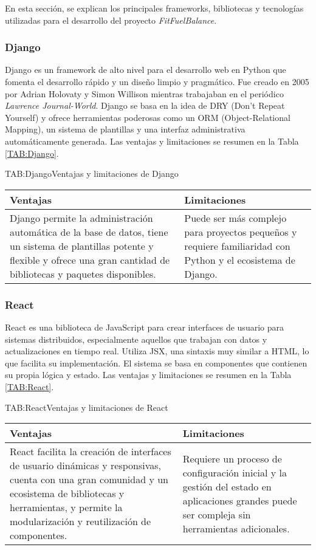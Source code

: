 En esta sección, se explican los principales frameworks, bibliotecas y tecnologías utilizadas para el desarrollo del proyecto \textit{FitFuelBalance}.

\subsubsection{Django}

Django es un framework de alto nivel para el desarrollo web en Python que fomenta el desarrollo rápido y un diseño limpio y pragmático. Fue creado en 2005 por Adrian Holovaty y Simon Willison mientras trabajaban en el periódico \textit{Lawrence Journal-World}. Django se basa en la idea de DRY (Don’t Repeat Yourself) y ofrece herramientas poderosas como un ORM (Object-Relational Mapping), un sistema de plantillas y una interfaz administrativa automáticamente generada. Las ventajas y limitaciones se resumen en la Tabla \ref{TAB:Django}.

\begin{table}[Django]{TAB:Django}{Ventajas y limitaciones de Django}
  \begin{tabular}{|p{7cm}|p{7cm}|}
    \hline
    \textbf{Ventajas} & \textbf{Limitaciones} \\
    \hline
    Django permite la administración automática de la base de datos, tiene un sistema de plantillas potente y flexible y ofrece una gran cantidad de bibliotecas y paquetes disponibles. & Puede ser más complejo para proyectos pequeños y requiere familiaridad con Python y el ecosistema de Django. \\
    \hline
  \end{tabular}
\end{table}

\subsubsection{React}

React es una biblioteca de JavaScript para crear interfaces de usuario para sistemas distribuidos, especialmente aquellos que trabajan con datos y actualizaciones en tiempo real. Utiliza JSX, una sintaxis muy similar a HTML, lo que facilita su implementación. El sistema se basa en componentes que contienen su propia lógica y estado. Las ventajas y limitaciones se resumen en la Tabla \ref{TAB:React}.

\begin{table}[React]{TAB:React}{Ventajas y limitaciones de React}
  \begin{tabular}{|p{7cm}|p{7cm}|}
    \hline
    \textbf{Ventajas} & \textbf{Limitaciones} \\
    \hline
    React facilita la creación de interfaces de usuario dinámicas y responsivas, cuenta con una gran comunidad y un ecosistema de bibliotecas y herramientas, y permite la modularización y reutilización de componentes. & Requiere un proceso de configuración inicial y la gestión del estado en aplicaciones grandes puede ser compleja sin herramientas adicionales. \\
    \hline
  \end{tabular}
\end{table}

